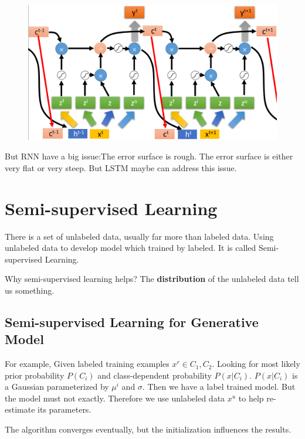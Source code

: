\documentclass{article}
\newenvironment{colblock}[1][\textbf{Collary}]{\begin{tcolorbox}[colback=JungleGreen!10!Cerulean!15,colframe=CornflowerBlue!60!Black,title = \textbf{#1}]}{\end{tcolorbox}}
\begin{document}
\begin{figure}[htbp]
  \centering
  \includegraphics[scale=0.5]{pic/lstm.png}
  \label{fig:my_label}
\end{figure}

But RNN have a big issue:The error surface is rough. The error surface is either very flat or very steep. But LSTM maybe can address this issue.

\section{Semi-supervised Learning}

\begin{colblock}[Definition of Semi-supervised Learning]
    There is a set of unlabeled data, usually far more than labeled data. Using unlabeled data to develop model which trained by labeled. It is called Semi-supervised Learning.
\end{colblock}

Why semi-supervised learning helps? The \textbf{distribution} of the unlabeled data tell us something.

\subsection{Semi-supervised Learning for Generative Model}

For example, Given labeled training examples $x^r \in C_1,C_2$. Looking for most likely prior probability $P(C_i)$ and class-dependent probability $P(x|C_i)$. $P(x|C_i)$ is a Gaussian parameterized by $\mu^i$ and $\sigma$. Then we have a label trained model. But the model must not exactly. Therefore we use unlabeled data $x^u$ to help re-estimate its parameters.

The algorithm converges eventually, but the initialization influences the results.
 
\end{document}
